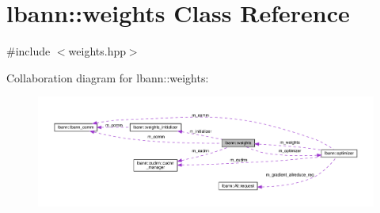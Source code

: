 \hypertarget{classlbann_1_1weights}{}\section{lbann\+:\+:weights Class Reference}
\label{classlbann_1_1weights}


{\ttfamily \#include $<$weights.\+hpp$>$}



Collaboration diagram for lbann\+:\+:weights\+:\nopagebreak
\begin{figure}[H]
\begin{center}
\leavevmode
\includegraphics[width=350pt]{classlbann_1_1weights__coll__graph}
\end{center}
\end{figure}
